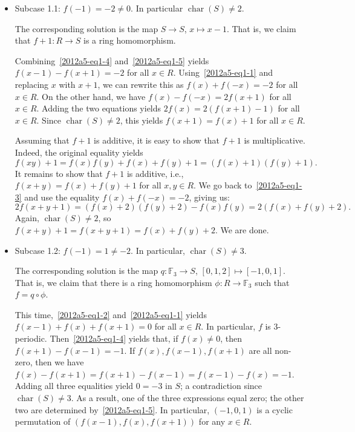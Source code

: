 \documentclass{article}
\newcommand{\F}{\mathbb{F}}
\DeclareMathOperator{\rchar}{char}
\begin{document}
\begin{itemize}

    \item
    Subcase 1.1: $f(-1) = -2 \neq 0$.
    In particular $\rchar(S) \neq 2$.

    The corresponding solution is the map $S \to S$, $x \mapsto x - 1$.
    That is, we claim that $f + 1 : R \to S$ is a ring homomorphism.
    
    Combining~\eqref{2012a5-eq1-4} and~\eqref{2012a5-eq1-5} yields $f(x - 1) - f(x + 1) = -2$ for all $x \in R$.
    Using~\eqref{2012a5-eq1-1} and replacing $x$ with $x + 1$, we can rewrite this as $f(x) + f(-x) = -2$ for all $x \in R$.
    On the other hand, we have $f(x) - f(-x) = 2 f(x + 1)$ for all $x \in R$.
    Adding the two equations yields $2 f(x) = 2 (f(x + 1) - 1)$ for all $x \in R$.
    Since $\rchar(S) \neq 2$, this yields $f(x + 1) = f(x) + 1$ for all $x \in R$.

    Assuming that $f + 1$ is additive, it is easy to show that $f + 1$ is multiplicative.
    Indeed, the original equality yields
    \[ f(xy) + 1 = f(x) f(y) + f(x) + f(y) + 1 = (f(x) + 1)(f(y) + 1). \]
    It remains to show that $f + 1$ is additive, i.e., $f(x + y) = f(x) + f(y) + 1$ for all $x, y \in R$.
    We go back to~\eqref{2012a5-eq1-3} and use the equality $f(x) + f(-x) = -2$, giving us:
    \[ 2 f(x + y + 1) = (f(x) + 2) (f(y) + 2) - f(x) f(y) = 2 (f(x) + f(y) + 2). \]
    Again, $\rchar(S) \neq 2$, so $f(x + y) + 1 = f(x + y + 1) = f(x) + f(y) + 2$.
    We are done.


    \item
    Subcase 1.2: $f(-1) = 1 \neq -2$.
    In particular, $\rchar(S) \neq 3$.

    The corresponding solution is the map $q : \F_3 \to S$, $[0, 1, 2] \mapsto [-1, 0, 1]$.
    That is, we claim that there is a ring homomorphism $\phi : R \to \F_3$ such that $f = q \circ \phi$.

    This time,~\eqref{2012a5-eq1-2} and~\eqref{2012a5-eq1-1} yields $f(x - 1) + f(x) + f(x + 1) = 0$ for all $x \in R$.
    In particular, $f$ is $3$-periodic.
    Then~\ref{2012a5-eq1-4} yields that, if $f(x) \neq 0$, then $f(x + 1) - f(x - 1) = -1$.
    If $f(x), f(x - 1), f(x + 1)$ are all non-zero, then we have $f(x) - f(x + 1) = f(x + 1) - f(x - 1) = f(x - 1) - f(x) = -1$.
    Adding all three equalities yield $0 = -3$ in $S$; a contradiction since $\rchar(S) \neq 3$.
    As a result, one of the three expressions equal zero; the other two are determined by~\ref{2012a5-eq1-5}.
    In particular, $(-1, 0, 1)$ is a cyclic permutation of $(f(x - 1), f(x), f(x + 1))$ for any $x \in R$.
    

\end{itemize}
\end{document}

